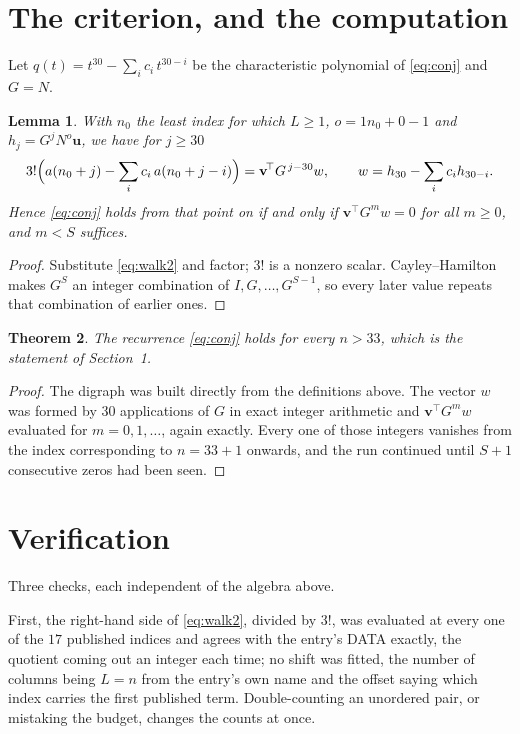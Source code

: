 \documentclass[11pt,a4paper]{article}
\theoremstyle{plain}
\newtheorem{theorem}{Theorem}
\newtheorem{lemma}[theorem]{Lemma}
\theoremstyle{definition}
\begin{document}
\section{The criterion, and the computation}

Let $q(t)=t^{30}-\sum_i c_i\,t^{30-i}$ be the characteristic polynomial of
\eqref{eq:conj} and $G=N$.

\begin{lemma}\label{lem:crit}
With $n_0$ the least index for which $L\ge1$, $o=1n_0+0-1$ and
$h_j=G^{j}N^{o}\mathbf{u}$, we have for $j\ge30$
\[
3!\Bigl(a(n_0+j)-\sum_i c_i\,a(n_0+j-i)\Bigr)=\mathbf{v}^{\!\top}G^{\,j-30}w,
\qquad w=h_{30}-\sum_i c_ih_{30-i} .
\]
Hence \eqref{eq:conj} holds from that point on if and only if
$\mathbf{v}^{\!\top}G^{m}w=0$ for all $m\ge0$, and $m<S$ suffices.
\end{lemma}

\begin{proof}
Substitute \eqref{eq:walk2} and factor; $3!$ is a nonzero scalar. Cayley--Hamilton
makes $G^{S}$ an integer combination of $I,G,\dots,G^{S-1}$, so every later value repeats
that combination of earlier ones.
\end{proof}

\begin{theorem}
The recurrence \eqref{eq:conj} holds for every $n>33$, which is the statement of
Section~1.
\end{theorem}

\begin{proof}
The digraph was built directly from the definitions above. The vector $w$ was formed by
$30$ applications of $G$ in exact integer arithmetic and $\mathbf{v}^{\!\top}G^{m}w$
evaluated for $m=0,1,\dots$, again exactly. Every one of those integers vanishes from the
index corresponding to $n=33+1$ onwards, and the run continued until $S+1$ consecutive
zeros had been seen.
\end{proof}

\section{Verification}

Three checks, each independent of the algebra above.

First, the right-hand side of \eqref{eq:walk2}, divided by $3!$, was evaluated at every
one of the $17$ published indices and agrees with the entry's DATA exactly, the quotient
coming out an integer each time; no shift was fitted, the number of columns being $L=n$
from the entry's own name and the offset saying which index carries the first published term.
Double-counting an unordered pair, or mistaking the budget, changes the counts at once.
\end{document}
